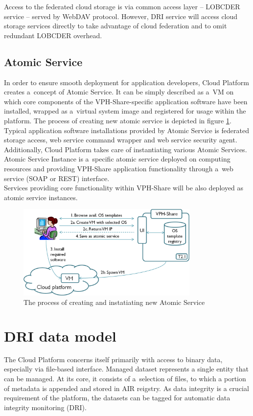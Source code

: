 Access to the federated cloud storage is via common access layer -- LOBCDER
service -- served by WebDAV protocol. However, DRI service will access
cloud storage services directly to take advantage of cloud federation and
to omit redundant LOBCDER overhead.

\subsection{Atomic Service}
\label{atomic-service}
In order to ensure smooth deployment for application developers, Cloud Platform
creates a~concept of Atomic Service. It can be simply described as a~VM on which
core components of the VPH-Share-specific application software have been installed,
wrapped as a~virtual system image and registered for usage within the platform. The
process of creating new atomic service is depicted in figure \ref{fig:atomic-service}.
Typical application software installations provided by Atomic Service is federated
storage access, web service command wrapper and web service security agent. Additionally,
Cloud Platform takes care of instantiating various Atomic Services. Atomic Service
Instance is a~specific atomic service deployed on computing resources and providing
VPH-Share application functionality through a~web service (SOAP or REST) interface.\\

Services providing core functionality within VPH-Share will be also deployed as atomic
service instances. 

\begin{figure}[h!]
	\centering
	\includegraphics[width=0.8\textwidth]{images/vph-atomic-service.png}
	\caption{The process of creating and instatiating new Atomic Service}
	\label{fig:atomic-service}
\end{figure}


\section{DRI data model}
The Cloud Platform concerns itself primarily with access to binary data, 
especially via file-based interface. Managed dataset represents a single entity
that can be managed. At its core, it consists of a~selection of
files, to which a portion of metadata is appended and stored in AIR reigstry. 
As data integrity is a crucial requirement of the platform, the datasets can be
tagged for automatic data integrity monitoring (DRI). 

